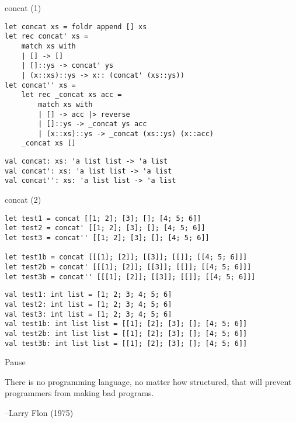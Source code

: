 \documentclass[t]{beamer}
\begin{document}
\begin{frame}[label={sec:orgb11611b},fragile]{concat (1)}
 \begin{verbatim}
let concat xs = foldr append [] xs
let rec concat' xs = 
    match xs with
    | [] -> []
    | []::ys -> concat' ys
    | (x::xs)::ys -> x:: (concat' (xs::ys))
let concat'' xs =
    let rec _concat xs acc = 
        match xs with
        | [] -> acc |> reverse
        | []::ys -> _concat ys acc
        | (x::xs)::ys -> _concat (xs::ys) (x::acc)
    _concat xs []
\end{verbatim}

\begin{verbatim}
val concat: xs: 'a list list -> 'a list
val concat': xs: 'a list list -> 'a list
val concat'': xs: 'a list list -> 'a list
\end{verbatim}
\end{frame}

\begin{frame}[label={sec:org2f4e064},fragile]{concat (2)}
 \begin{verbatim}
let test1 = concat [[1; 2]; [3]; []; [4; 5; 6]]
let test2 = concat' [[1; 2]; [3]; []; [4; 5; 6]]
let test3 = concat'' [[1; 2]; [3]; []; [4; 5; 6]]

let test1b = concat [[[1]; [2]]; [[3]]; [[]]; [[4; 5; 6]]]
let test2b = concat' [[[1]; [2]]; [[3]]; [[]]; [[4; 5; 6]]] 
let test3b = concat'' [[[1]; [2]]; [[3]]; [[]]; [[4; 5; 6]]] 
\end{verbatim}

\begin{verbatim}
val test1: int list = [1; 2; 3; 4; 5; 6]
val test2: int list = [1; 2; 3; 4; 5; 6]
val test3: int list = [1; 2; 3; 4; 5; 6]
val test1b: int list list = [[1]; [2]; [3]; []; [4; 5; 6]]
val test2b: int list list = [[1]; [2]; [3]; []; [4; 5; 6]]
val test3b: int list list = [[1]; [2]; [3]; []; [4; 5; 6]]
\end{verbatim}
\end{frame}

\begin{frame}[label={sec:orgdbb5e24}]{Pause}
\begin{block}{}
There is no programming language, no matter how structured, 
that will prevent programmers from making bad programs.

\null\hfill--Larry Flon (1975)
\end{block}
\end{frame}
\end{document}
